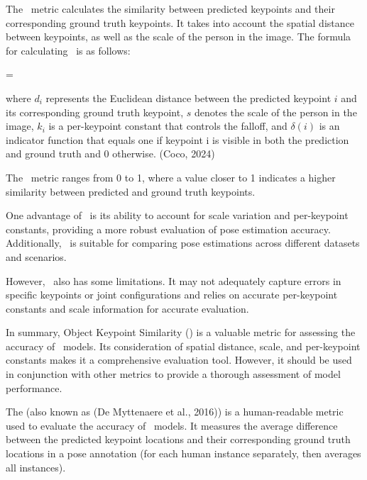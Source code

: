 The \OKS\ metric calculates the similarity between predicted keypoints and their corresponding ground truth keypoints. It takes into account the spatial distance between keypoints, as well as the scale of the person in the image. The formula for calculating \OKS\ is as follows:

\startplaceformula[reference=oks]
 \startformula \mbox{\OKS} = 
 \stopformula
\stopplaceformula

where $ d_i $ represents the Euclidean distance between the predicted keypoint $ i $ and its corresponding ground truth keypoint, $ s $ denotes the scale of the person in the image, $ k_i $ is a per-keypoint constant that controls the falloff, and $ \delta(i) $ is an indicator function that equals one if keypoint i is visible in both the prediction and ground truth and 0 otherwise. (\scc Coco, 2024)

The \OKS\ metric ranges from 0 to 1, where a value closer to 1 indicates a higher similarity between predicted and ground truth keypoints.

One advantage of \OKS\ is its ability to account for scale variation and per-keypoint constants, providing a more robust evaluation of pose estimation accuracy. Additionally, \OKS\ is suitable for comparing pose estimations across different datasets and scenarios.

However, \OKS\ also has some limitations. It may not adequately capture errors in specific keypoints or joint configurations and relies on accurate per-keypoint constants and scale information for accurate evaluation.

In summary, Object Keypoint Similarity (\OKS) is a valuable metric for assessing the accuracy of \HPE\ models. Its consideration of spatial distance, scale, and per-keypoint constants makes it a comprehensive evaluation tool. However, it should be used in conjunction with other metrics to provide a thorough assessment of model performance.

The \pojem{\APE} (also known as  (\scc De Myttenaere et al., 2016)) is a human-readable metric used to evaluate the accuracy of \HPE\ models. It measures the average difference between the predicted keypoint locations and their corresponding ground truth locations in a pose annotation (for each human instance separately, then averages all instances).

